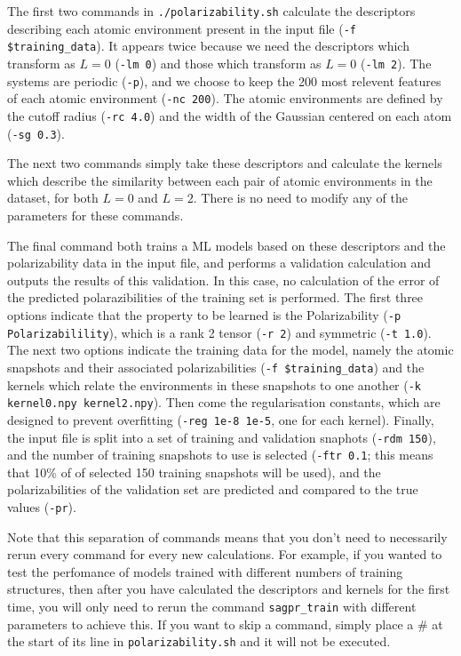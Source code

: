 \documentclass{article}
\begin{document}

The first two commands in \verb|./polarizability.sh| calculate the descriptors describing each atomic environment present in the input file (\verb|-f $training_data|). It appears twice because we need the descriptors which transform as $L=0$ (\verb|-lm 0|) and those which transform as $L=0$ (\verb|-lm 2|). The systems are periodic (\verb|-p|), and we choose to keep the 200 most relevent features of each atomic environment (\verb|-nc 200|). The atomic environments are defined by the cutoff radius (\verb|-rc 4.0|) and the width of the Gaussian centered on each atom (\verb|-sg 0.3|).

The next two commands simply take these descriptors and calculate the kernels which describe the similarity between each pair of atomic environments in the dataset, for both $L=0$ and $L=2$. There is no need to modify any of the parameters for these commands.

The final command both trains a ML models based on these descriptors and the polarizability data in the input file, and performs a validation calculation and outputs the results of this validation. In this case, no calculation of the error of the predicted polarazibilities of the training set is performed. The first three options indicate that the property to be learned is the Polarizability (\verb|-p Polarizabilility|), which is a rank 2 tensor (\verb|-r 2|) and symmetric (\verb|-t 1.0|). The next two options indicate the training data for the model, namely the atomic snapshots and their associated polarizabilities (\verb|-f $training_data|) and the kernels which relate the environments in these snapshots to one another (\verb|-k kernel0.npy kernel2.npy|). Then come the regularisation constants, which are designed to prevent overfitting (\verb|-reg 1e-8 1e-5|, one for each kernel). Finally, the input file is split into a set of training and validation snaphots (\verb|-rdm 150|), and the number of training snapshots to use is selected (\verb|-ftr 0.1|; this means that 10\% of of selected 150 training snapshots will be used), and the polarizabilities of the validation set are predicted and compared to the true values (\verb|-pr|).

Note that this separation of commands means that you don't need to necessarily rerun every command for every new calculations. For example, if you wanted to test the perfomance of models trained with different numbers of training structures, then after you have calculated the descriptors and kernels for the first time, you will only need to rerun the command \verb|sagpr_train| with different parameters to achieve this. If you want to skip a command, simply place a \# at the start of its line in \verb|polarizability.sh| and it will not be executed.
\end{document}

